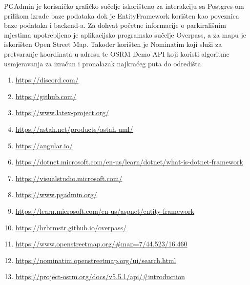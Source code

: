 			 
			 {PGAdmin je korisničko grafičko sučelje iskorišteno za interakciju sa Postgres-om prilikom izrade baze podataka dok je EntityFramework korišten kao poveznica baze podataka i backend-a. Za dohvat početne informacije o parkirališnim mjestima upotrebljeno je aplikacijsko programsko sučelje Overpass, a za mapu je iskorišten Open Street Map. Također korišten je Nominatim koji služi za pretvaranje koordinata u adresu te OSRM Demo API koji koristi algoritme usmjeravanja za izračun i pronalazak najkraćeg puta do odredišta.}
			
			\begin{enumerate}
				
				
				\item   \url{https://discord.com/}
				
				\item   \url{https://github.com/}
				
				\item   \url{https://www.latex-project.org/}
				
				\item  \url{https://astah.net/products/astah-uml/}
				
				\item   \url{https://angular.io/}
				
				\item   \url{https://dotnet.microsoft.com/en-us/learn/dotnet/what-is-dotnet-framework}
				
				\item   \url{https://visualstudio.microsoft.com/}
				
				\item   \url{https://www.pgadmin.org/}
				
				\item   \url{https://learn.microsoft.com/en-us/aspnet/entity-framework}
				
				\item   \url{https://hrbrmstr.github.io/overpass/}
				
				\item   \url{https://www.openstreetmap.org/#map=7/44.523/16.460}
				
				\item   \url{https://nominatim.openstreetmap.org/ui/search.html}
				
				\item   \url{https://project-osrm.org/docs/v5.5.1/api/#introduction}
				
				
			\end{enumerate}
			
